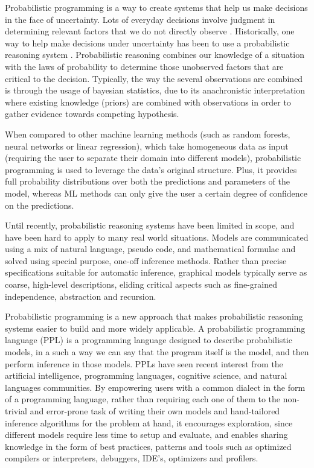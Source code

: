 \begin{itemsize}
Probabilistic programming is a way to create systems that help us make decisions
in the face of uncertainty. Lots of everyday decisions involve judgment in
determining relevant factors that we do not directly observe \cite{Szolovits1993}. Historically,
one way to help make decisions under uncertainty has been to use a probabilistic
reasoning system \cite{Lassiter2012}. Probabilistic reasoning combines our knowledge of a situation
with the laws of probability to determine those unobserved factors that are
critical to the decision. Typically, the way the several observations are
combined is through the usage of bayesian statistics, due to its anachronistic
interpretation where existing knowledge (priors) are combined with observations
in order to gather evidence towards competing hypothesis.

When compared to other machine learning methods (such as random forests, neural
networks or linear regression), which take homogeneous data as input (requiring
the user to separate their domain into different models), probabilistic
programming is used to leverage the data’s original structure. Plus, it provides
full probability distributions over both the predictions and parameters of the
model, whereas ML methods can only give the user a certain degree of confidence
on the predictions.

Until recently, probabilistic reasoning systems have been limited in scope, and
have been hard to apply to many real world situations. Models are communicated
using a mix of natural language, pseudo code, and mathematical formulae and solved
using special purpose, one-off inference methods. Rather than precise
specifications suitable for automatic inference, graphical models typically
serve as coarse, high-level descriptions, eliding critical aspects such as
fine-grained independence, abstraction and recursion.

Probabilistic programming is a new approach that makes probabilistic reasoning
systems easier to build and more widely applicable. A probabilistic programming
language (PPL) is a programming language designed to describe probabilistic
models, in a such a way we can say that the program itself is the model, and
then perform inference in those models. PPLs have seen recent interest from the
artificial intelligence, programming languages, cognitive science, and natural
languages communities. By empowering users with a common dialect in the form of
a programming language, rather than requiring each one of them to the
non-trivial and error-prone task of writing their own models and hand-tailored
inference algorithms for the problem at hand, it encourages exploration, since
different models require less time to setup and evaluate, and enables sharing
knowledge in the form of best practices, patterns and tools such as optimized
compilers or interpreters, debuggers, IDE’s, optimizers and profilers.


\end{itemsize}
